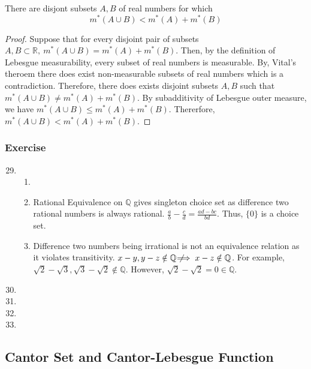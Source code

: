 \begin{theorem}
	There are disjont subsets $A,B$ of real numbers for which
	\begin{equation}
		m^\ast(A \cup B) < m^\ast(A) + m^\ast(B)
	\end{equation}
\end{theorem}
\begin{proof}
	Suppose that for every disjoint pair of subsets $A,B \subset \mathbb{R},\ m^\ast(A \cup B) = m^\ast(A) + m^\ast(B)$.
	Then, by the definition of Lebesgue measurability, every subset of real numbers is measurable.
	By, Vital's theroem there does exist non-measurable subsets of real numbers which is a contradiction.
	Therefore, there does exists disjoint subsets $A,B$ such that $m^\ast(A \cup B) \ne m^\ast(A) + m^\ast(B)$.
	By subadditivity of Lebesgue outer measure, we have $m^\ast(A \cup B) \le m^\ast(A) + m^\ast(B)$.
	Thererfore, $m^\ast(A \cup B) < m^\ast(A)+ m^\ast(B)$.
\end{proof}

\subsubsection{Exercise}
\begin{enumerate}
	\setcounter{enumi}{28}
	\item
	\begin{enumerate}
		\item
		\item Rational Equivalence on $\mathbb{Q}$ gives singleton choice set as difference two rational numbers is always rational. $\frac{a}{b} - \frac{c}{d} = \frac{ad-bc}{bd}$. Thus, $\{ 0 \}$ is a choice set.
		\item Difference two numbers being irrational is not an equivalence relation as it violates transitivity.
		$x - y, y-z \notin \mathbb{Q} \not\!\!\!\implies x-z \notin \mathbb{Q}$.
		For example, $\sqrt{2} - \sqrt{3}, \sqrt{3} - \sqrt{2}  \not\in \mathbb{Q}$.
		However, $\sqrt{2} - \sqrt{2} = 0 \in \mathbb{Q}$.
		\end{enumerate}
	\item
	\item
	\item
	\item
\end{enumerate}

\subsection{Cantor Set and Cantor-Lebesgue Function}


